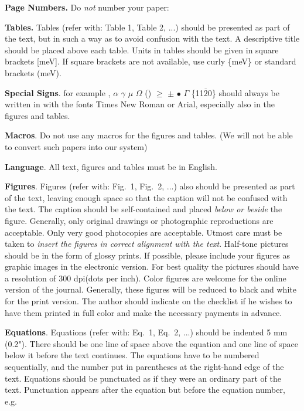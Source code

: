 \documentclass{ttp}
\begin{document}
\textbf{Page Numbers.} Do \textit{not} number your paper:

\textbf{Tables.} Tables (refer with: Table 1, Table 2, ...) should be presented as part of the text, but in such a
way as to avoid confusion with the text. A descriptive title should be placed above each table. Units in tables should
 be given in square brackets [meV]. If square brackets are not available, use curly \{meV\} or standard brackets (meV).

\textbf{Special Signs}. for example , $\alpha$ $\gamma$  $\mu$ $\Omega$ () $\ge$  $\pm$ $\bullet$  $\Gamma$ \{11$\overline{2}$0\} should always be written in with the
fonts Times New Roman or Arial, especially also in the figures and tables.

\textbf{Macros}. Do not use any macros for the figures and tables. (We will not be able to convert such papers into our system)
\newpage

\textbf{Language}. All text, figures and tables must be in English.

\textbf{Figures}. Figures (refer with: Fig.~1, Fig.~2, ...) also should be presented as part of the text, leaving enough space so that the
caption will not be confused with the text. The caption should be self-contained and placed \textit{below or beside }the
figure. Generally, only original drawings or photographic reproductions are acceptable. Only very good photocopies are
acceptable. Utmost care must be taken to \textit{insert the figures in correct alignment with the text}. Half-tone pictures
 should be in the form of glossy prints. If possible, please include your figures as graphic images in the electronic version.
For best quality the pictures should have a resolution of 300 dpi(dots per inch).
\noindent Color figures are welcome for the online version of the journal. Generally, these figures will be reduced to black
and white for the print version. The author should indicate on the checklist if he wishes to have them printed in full color
and make the necessary payments in advance.

\vspace{6pt}
\textbf{Equations}.  Equations (refer with: Eq.~1, Eq.~2, ...) should be indented 5 mm (0.2").
There should be one line of space above the equation and one line of space below it before the text continues.
The equations have to be numbered sequentially, and the number put in parentheses at the right-hand edge of the
text. Equations should be punctuated as if they were an ordinary part of the text. Punctuation appears after the
equation but before the equation number, e.g.
\end{document}
